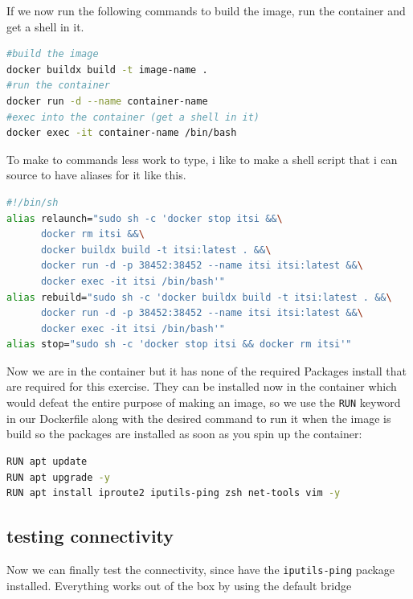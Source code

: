 \documentclass[a4paper]{article}
\begin{document}
If we now run the following commands to build the image, run the container and get a shell in it.
\begin{lstlisting}[language=bash]
#build the image
docker buildx build -t image-name .
#run the container
docker run -d --name container-name 
#exec into the container (get a shell in it)
docker exec -it container-name /bin/bash
\end{lstlisting}
To make to commands less work to type, i like to make a shell script that i can source to have aliases for it like this.
\begin{lstlisting}[language=bash]
#!/bin/sh
alias relaunch="sudo sh -c 'docker stop itsi &&\
      docker rm itsi &&\
      docker buildx build -t itsi:latest . &&\
      docker run -d -p 38452:38452 --name itsi itsi:latest &&\
      docker exec -it itsi /bin/bash'"
alias rebuild="sudo sh -c 'docker buildx build -t itsi:latest . &&\
      docker run -d -p 38452:38452 --name itsi itsi:latest &&\
      docker exec -it itsi /bin/bash'"
alias stop="sudo sh -c 'docker stop itsi && docker rm itsi'"
\end{lstlisting}
Now we are in the container but it has none of the required Packages install that are required for this exercise. They can be installed now in the container which would defeat the entire purpose of making an image, so we use the \texttt{RUN} keyword in our Dockerfile along with the desired command to run it when the image is build so the packages are installed as soon as you spin up the container:
\begin{lstlisting}[language=bash]
RUN apt update 
RUN apt upgrade -y
RUN apt install iproute2 iputils-ping zsh net-tools vim -y
\end{lstlisting}
\newpage
\subsection{testing connectivity}
Now we can finally test the connectivity, since have the \texttt{iputils-ping} package installed. Everything works out of the box by using the default bridge \cite{Docker-bridge}
\end{document}
